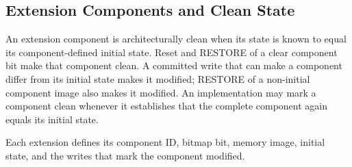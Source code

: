\subsection{Extension Components and Clean State}
An extension component is architecturally clean when its state is known to equal its component-defined initial
state. Reset and RESTORE of a clear component bit make that component clean. A committed write that can make a
component differ from its initial state makes it modified; RESTORE of a non-initial component image also makes it
modified. An implementation may mark a component clean whenever it establishes that the complete component again
equals its initial state.

Each extension defines its component ID, bitmap bit, memory image, initial state, and the writes that mark the
component modified.

